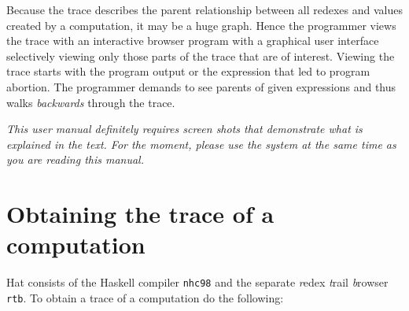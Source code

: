 \documentclass[12pt]{article}
\begin{document}
Because the trace describes the parent relationship between all redexes and values created by a computation, it may be a huge graph. Hence the programmer views the trace with an interactive browser program with a graphical user interface selectively viewing only those parts of the trace that are of interest.
Viewing the trace starts with the program output or the expression that led to program abortion. The programmer demands to see parents of given expressions and thus walks \emph{backwards} through the trace.

\emph{This user manual definitely requires screen shots that demonstrate what is explained in the text. For the moment, please use the system at the same time as you are reading this manual.}


\section{Obtaining the trace of a computation}

Hat consists of the Haskell compiler \texttt{nhc98} and the separate \emph{r}edex \emph{t}rail \emph{b}rowser \texttt{rtb}. To obtain a trace of a computation do the following:
\end{document}
